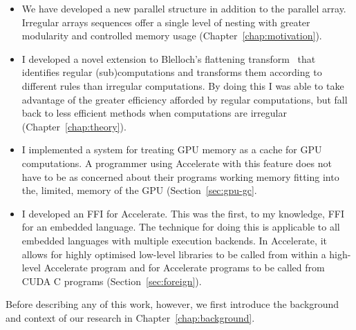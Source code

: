 \begin{itemize}
\item We have developed a new parallel structure in addition to the parallel array. Irregular arrays sequences offer a single level of nesting with greater modularity and controlled memory usage (Chapter~\ref{chap:motivation}).
\item I developed a novel extension to Blelloch's flattening transform~\cite{Blelloch:compiling1988,Blelloch:nesl1995} that identifies regular (sub)computations and transforms them according to different rules than irregular computations. By doing this I was able to take advantage of the greater efficiency afforded by regular computations, but fall back to less efficient methods when computations are irregular (Chapter~\ref{chap:theory}).
\item I implemented a system for treating GPU memory as a cache for GPU computations. A programmer using Accelerate with this feature does not have to be as concerned about their programs working memory fitting into the, limited, memory of the GPU (Section~\ref{sec:gpu-gc}.
\item I developed an FFI for Accelerate. This was the first, to my knowledge, FFI for an embedded language. The technique for doing this is applicable to all embedded languages with multiple execution backends. In Accelerate, it allows for highly optimised low-level libraries to be called from within a high-level Accelerate program and for Accelerate programs to be called from CUDA C programs (Section~\ref{sec:foreign}).
\end{itemize}

Before describing any of this work, however, we first introduce the background and context of our research in Chapter~\ref{chap:background}.
